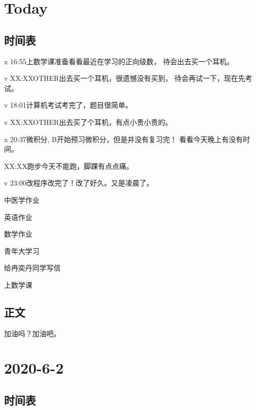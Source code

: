 \documentclass{peterlitsdoc}
\begin{document}
\section{Today}

\subsection{时间表}

\begin{pltplan}
\item[x]{16:55}{上数学课}{准备看看最近在学习的正向级数，
    待会出去买一个耳机。}
\item[v]{XX:XX}{OTHER}{出去买一个耳机，很遗憾没有买到，
    待会再试一下，现在先考试。}
\item[v]{18:01}{计算机考试}{考完了，题目很简单。}
\item[v]{XX:XX}{OTHER}{出去买了个耳机，有点小贵小贵的。}
\item[x]{20:37}{微积分, B}{开始预习微积分，但是并没有复习完！
    看看今天晚上有没有时间。}
\item[ ]{XX:XX}{跑步}{今天不能跑，脚踝有点点痛。}
\item[v]{23:00}{改程序}{改完了！改了好久。又是凌晨了。}
\item[ ]{}{中医学作业}{}
\item[ ]{}{英语作业}{}
\item[ ]{}{数学作业}{}
\item[ ]{}{青年大学习}{}
\item[ ]{}{给冉奕丹同学写信}{}
\item[ ]{}{上数学课}{}
\end{pltplan}

\subsection{正文}

加油吗？加油吧。


\section{2020-6-2}

\subsection{时间表}
\end{document}
